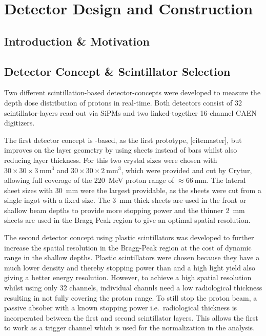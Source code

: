\chapter{Detector Design and Construction}\label{chapter:setup}

\section{Introduction \& Motivation}

\section{Detector Concept \& Scintillator Selection}\label{section:detector:concept}
Two different scintillation-based detector-concepts were developed to measure the depth dose distribution of protons in real-time.
Both detectors consist of 32 scintillator-layers read-out via \glspl{SiPM} and two linked-together 16-channel CAEN digitizers.

The first detector concept is -based, as the first prototype,  [citemaster], but improves on the layer geometry by using sheets instead of bars whilst also reducing layer thickness.
For this two crystal sizes were chosen with $30\times30\times3~\text{mm}^3$ and $30\times30\times2~\text{mm}^3$, which were provided and cut by Crytur, allowing full coverage of the \SI{220}{\mega\electronvolt} proton range of $\approx \SI{66}{\mm}$.
The lateral sheet sizes with \SI{30}{\mm} were the largest providable, as the sheets were cut from a single ingot with a fixed size.
The \SI{3}{\mm} thick sheets are used in the front or shallow beam depths to provide more stopping power and the thinner \SI{2}{\mm} sheets are used in the Bragg-Peak region to give an optimal spatial resolution.

The second detector concept using plastic scintillators was developed to further increase the spatial resolution in the Bragg-Peak region at the cost of dynamic range in the shallow depths. 
Plastic scintillators were chosen because they have a much lower density and thereby stopping power than  and a high light yield also giving a better energy resolution.
However, to achieve a high spatial resolution whilst using only 32 channels, individual channls need a low radiological thickness resulting in not fully covering the proton range.
To still stop the proton beam, a passive absober with a known stopping power i.e.~radiological thickness is incorperated between the first and second scintillator layers.
This allows the first to work as a trigger channel which is used for the normalization in the analysis.

